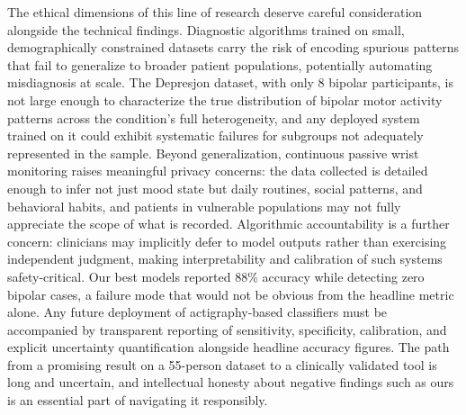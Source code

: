 The ethical dimensions of this line of research deserve careful consideration alongside the technical findings. Diagnostic algorithms trained on small, demographically constrained datasets carry the risk of encoding spurious patterns that fail to generalize to broader patient populations, potentially automating misdiagnosis at scale. The Depresjon dataset, with only 8 bipolar participants, is not large enough to characterize the true distribution of bipolar motor activity patterns across the condition's full heterogeneity, and any deployed system trained on it could exhibit systematic failures for subgroups not adequately represented in the sample. Beyond generalization, continuous passive wrist monitoring raises meaningful privacy concerns: the data collected is detailed enough to infer not just mood state but daily routines, social patterns, and behavioral habits, and patients in vulnerable populations may not fully appreciate the scope of what is recorded. Algorithmic accountability is a further concern: clinicians may implicitly defer to model outputs rather than exercising independent judgment, making interpretability and calibration of such systems safety-critical. Our best models reported 88\% accuracy while detecting zero bipolar cases, a failure mode that would not be obvious from the headline metric alone. Any future deployment of actigraphy-based classifiers must be accompanied by transparent reporting of sensitivity, specificity, calibration, and explicit uncertainty quantification alongside headline accuracy figures. The path from a promising result on a 55-person dataset to a clinically validated tool is long and uncertain, and intellectual honesty about negative findings such as ours is an essential part of navigating it responsibly.
